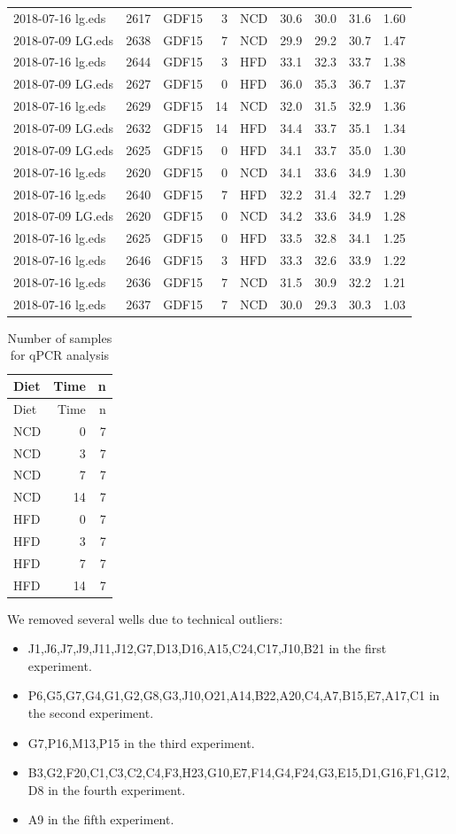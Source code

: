 \documentclass[]{article}
\providecommand{\tightlist}{%
  \setlength{\itemsep}{0pt}\setlength{\parskip}{0pt}}
\begin{document}
\begin{longtable}[]{@{}lllrlrrrr@{}}
2018-07-16 lg.eds & 2617 & GDF15 & 3 & NCD & 30.6 & 30.0 & 31.6 &
1.60\tabularnewline
2018-07-09 LG.eds & 2638 & GDF15 & 7 & NCD & 29.9 & 29.2 & 30.7 &
1.47\tabularnewline
2018-07-16 lg.eds & 2644 & GDF15 & 3 & HFD & 33.1 & 32.3 & 33.7 &
1.38\tabularnewline
2018-07-09 LG.eds & 2627 & GDF15 & 0 & HFD & 36.0 & 35.3 & 36.7 &
1.37\tabularnewline
2018-07-16 lg.eds & 2629 & GDF15 & 14 & NCD & 32.0 & 31.5 & 32.9 &
1.36\tabularnewline
2018-07-09 LG.eds & 2632 & GDF15 & 14 & HFD & 34.4 & 33.7 & 35.1 &
1.34\tabularnewline
2018-07-09 LG.eds & 2625 & GDF15 & 0 & HFD & 34.1 & 33.7 & 35.0 &
1.30\tabularnewline
2018-07-16 lg.eds & 2620 & GDF15 & 0 & NCD & 34.1 & 33.6 & 34.9 &
1.30\tabularnewline
2018-07-16 lg.eds & 2640 & GDF15 & 7 & HFD & 32.2 & 31.4 & 32.7 &
1.29\tabularnewline
2018-07-09 LG.eds & 2620 & GDF15 & 0 & NCD & 34.2 & 33.6 & 34.9 &
1.28\tabularnewline
2018-07-16 lg.eds & 2625 & GDF15 & 0 & HFD & 33.5 & 32.8 & 34.1 &
1.25\tabularnewline
2018-07-16 lg.eds & 2646 & GDF15 & 3 & HFD & 33.3 & 32.6 & 33.9 &
1.22\tabularnewline
2018-07-16 lg.eds & 2636 & GDF15 & 7 & NCD & 31.5 & 30.9 & 32.2 &
1.21\tabularnewline
2018-07-16 lg.eds & 2637 & GDF15 & 7 & NCD & 30.0 & 29.3 & 30.3 &
1.03\tabularnewline
\bottomrule
\end{longtable}

\begin{longtable}[]{@{}lrr@{}}
\caption{Number of samples for qPCR analysis}\tabularnewline
\toprule
Diet & Time & n\tabularnewline
\midrule
\endfirsthead
\toprule
Diet & Time & n\tabularnewline
\midrule
\endhead
NCD & 0 & 7\tabularnewline
NCD & 3 & 7\tabularnewline
NCD & 7 & 7\tabularnewline
NCD & 14 & 7\tabularnewline
HFD & 0 & 7\tabularnewline
HFD & 3 & 7\tabularnewline
HFD & 7 & 7\tabularnewline
HFD & 14 & 7\tabularnewline
\bottomrule
\end{longtable}

We removed several wells due to technical outliers:

\begin{itemize}
\tightlist
\item
  J1,J6,J7,J9,J11,J12,G7,D13,D16,A15,C24,C17,J10,B21 in the first
  experiment.
\item
  P6,G5,G7,G4,G1,G2,G8,G3,J10,O21,A14,B22,A20,C4,A7,B15,E7,A17,C1 in the
  second experiment.
\item
  G7,P16,M13,P15 in the third experiment.
\item
  B3,G2,F20,C1,C3,C2,C4,F3,H23,G10,E7,F14,G4,F24,G3,E15,D1,G16,F1,G12,D8
  in the fourth experiment.
\item
  A9 in the fifth experiment.
\end{itemize}
\end{document}
